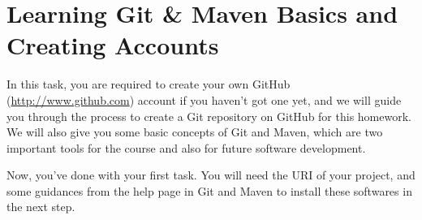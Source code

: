 
\chapter{Learning Git \& Maven Basics and Creating Accounts}

In this task, you are required to create your own GitHub
(\url{http://www.github.com}) account if you haven't got one yet, and we will
guide you through the process to create a Git repository on GitHub for this
homework. We will also give you some basic concepts of Git and Maven, which are
two important tools for the course and also for future software development.





Now, you've done with your first task. You will need the URI of your project,
and some guidances from the help page in Git and Maven to install these
softwares in the next step.